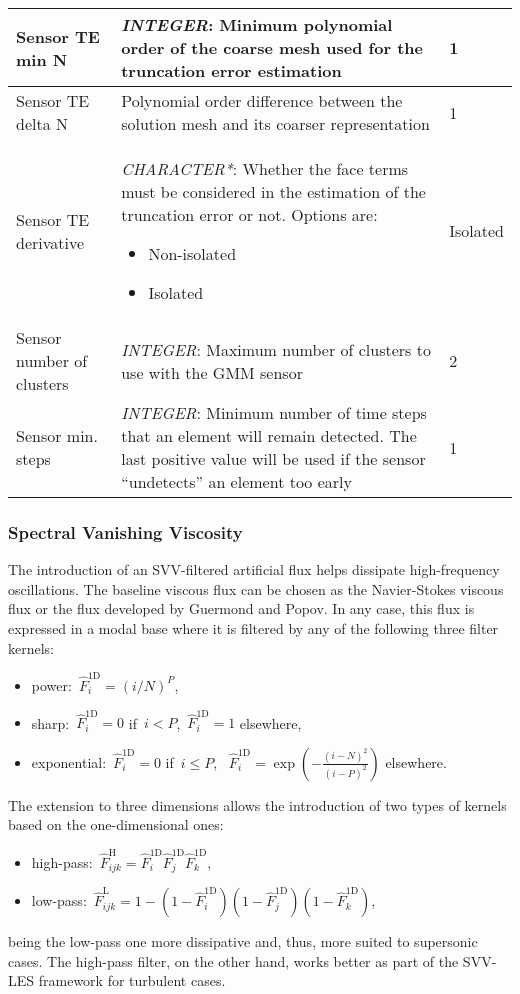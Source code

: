 \documentclass[a4paper,10pt]{report}
\begin{document}
\begin{longtable}{|l|p{10cm}|p{2.2cm}|}
Sensor TE min N & \textit{INTEGER}: Minimum polynomial order of the coarse mesh used for the truncation error estimation & 1 \\ \hline
Sensor TE delta N & Polynomial order difference between the solution mesh and its coarser representation & 1 \\ \hline
Sensor TE derivative & \textit{CHARACTER*}: Whether the face terms must be considered in the estimation of the truncation error or not. Options are:
    \begin{itemize}
        \item Non-isolated
        \item Isolated
    \end{itemize} & Isolated \\ \hline
Sensor number of clusters & \textit{INTEGER}: Maximum number of clusters to use with the GMM sensor & 2 \\ \hline
Sensor min. steps & \textit{INTEGER}: Minimum number of time steps that an element will remain detected. The last positive value will be used if the sensor ``undetects'' an element too early & 1 \\ \hline
\end{longtable}

\subsubsection{Spectral Vanishing Viscosity}

The introduction of an SVV-filtered artificial flux helps dissipate high-frequency oscillations. The baseline viscous flux can be chosen as the Navier-Stokes viscous flux or the flux developed by Guermond and Popov. In any case, this flux is expressed in a modal base where it is filtered by any of the following three filter kernels:
%
\begin{itemize}
    \item power:~$\hat{F}^{\text{1D}}_i = (i/N)^P$,
    \item sharp:~$\hat{F}^{\text{1D}}_i = 0$ if~$i<P$,~$\hat{F}^{\text{1D}}_i = 1$ elsewhere,
    \item exponential:~$\hat{F}^{\text{1D}}_i = 0$ if~$i \leq P$, ~$\hat{F}^{\text{1D}}_i=\exp\left(-\frac{(i-N)^2}{(i-P)^2}\right)$ elsewhere.
\end{itemize}
%
The extension to three dimensions allows the introduction of two types of kernels based on the one-dimensional ones:
%
\begin{itemize}
    \item high-pass:~$\hat{F}^{\text{H}}_{ijk} = \hat{F}^{\text{1D}}_i \hat{F}^{\text{1D}}_j \hat{F}^{\text{1D}}_k$,
    \item low-pass:~$\hat{F}^{\text{L}}_{ijk} = 1 - \left(1-\hat{F}^{\text{1D}}_i\right)\left(1-\hat{F}^{\text{1D}}_j\right)\left(1-\hat{F}^{\text{1D}}_k\right)$,
\end{itemize}
%
being the low-pass one more dissipative and, thus, more suited to supersonic cases. The high-pass filter, on the other hand, works better as part of the SVV-LES framework for turbulent cases.
\end{document}

